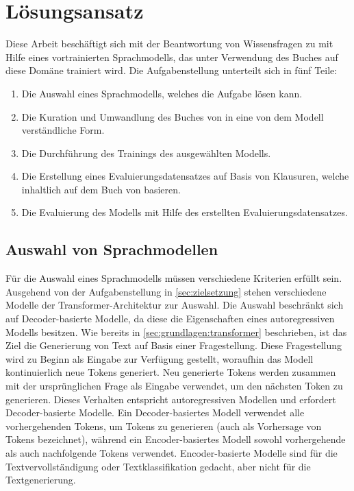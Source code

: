 \chapter{Lösungsansatz}\label{ch:approach}
Diese Arbeit beschäftigt sich mit der Beantwortung von Wissensfragen zu \citet{bb} mit Hilfe eines vortrainierten Sprachmodells,
das unter Verwendung des Buches \citet{bb} auf diese Domäne trainiert wird.
Die Aufgabenstellung unterteilt sich in fünf Teile:
\begin{enumerate}
    \item Die Auswahl eines Sprachmodells, welches die Aufgabe lösen kann.
    \item Die Kuration und Umwandlung des Buches von \citet{bb} in eine von dem Modell verständliche Form.
    \item Die Durchführung des Trainings des ausgewählten Modells.
    \item Die Erstellung eines Evaluierungsdatensatzes auf Basis von Klausuren, welche inhaltlich auf dem Buch von \citet{bb} basieren.
    \item Die Evaluierung des Modells mit Hilfe des erstellten Evaluierungsdatensatzes.
\end{enumerate}

\section{Auswahl von Sprachmodellen}
Für die Auswahl eines Sprachmodells müssen verschiedene Kriterien erfüllt sein.
Ausgehend von der Aufgabenstellung in \cref{sec:zielsetzung} stehen verschiedene Modelle der Transformer-Architektur zur Auswahl.
Die Auswahl beschränkt sich auf Decoder-basierte Modelle, da diese die Eigenschaften eines autoregressiven Modells besitzen.
Wie bereits in \cref{sec:grundlagen:transformer} beschrieben, ist das Ziel die Generierung von Text auf Basis einer Fragestellung.
Diese Fragestellung wird zu Beginn als Eingabe zur Verfügung gestellt, woraufhin das Modell kontinuierlich neue Tokens generiert.
Neu generierte Tokens werden zusammen mit der ursprünglichen Frage als Eingabe verwendet, um den nächsten Token zu generieren.
Dieses Verhalten entspricht autoregressiven Modellen und erfordert Decoder-basierte Modelle.
Ein Decoder-basiertes Modell verwendet alle vorhergehenden Tokens, um Tokens zu generieren (auch als Vorhersage von Tokens bezeichnet), während ein Encoder-basiertes Modell sowohl vorhergehende als auch nachfolgende Tokens verwendet.
Encoder-basierte Modelle sind für die Textvervollständigung oder Textklassifikation gedacht, aber nicht für die Textgenerierung.\\

